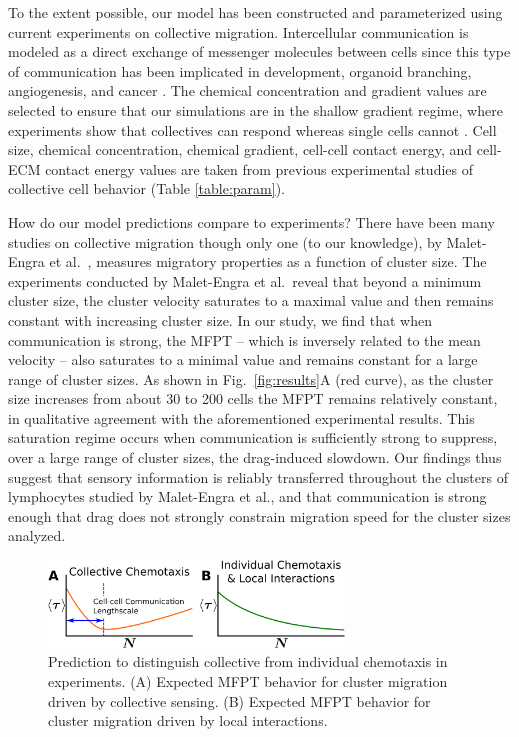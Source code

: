 To the extent possible, our model has been constructed and parameterized using current experiments on collective migration. Intercellular communication is modeled as a direct exchange of messenger molecules between cells since this type of  communication has been implicated in development, organoid branching, angiogenesis, and cancer \cite{ramel2013rab11,ellison2016cell,gerhardt2003vegf,hsu2000cadherin,friedl2009collective}. The chemical concentration and gradient values are selected to ensure that our simulations are in the shallow gradient regime, where experiments show that collectives can respond whereas single cells cannot \cite{ellison2016cell,malet2015collective,rosoff2004new}. Cell size, chemical concentration, chemical gradient, cell-cell contact energy, and cell-ECM contact energy values are taken from previous experimental studies of collective cell behavior (Table \ref{table:param}).

How do our model predictions compare to experiments? There have been many studies on collective migration \cite{cheung2013collective,puliafito2015three,defranco2008migrating,ramel2013rab11} though only one (to our knowledge), by Malet-Engra et al.\ \cite{malet2015collective}, measures migratory properties as a function of cluster size. The experiments conducted by Malet-Engra et al.\ reveal that beyond a minimum cluster size, the cluster velocity saturates to a maximal value and then remains constant with increasing cluster size. In our study, we find that when communication is strong, the MFPT -- which is inversely related to the mean velocity -- also saturates to a minimal value and remains constant for a large range of cluster sizes. As shown in Fig.\ \ref{fig:results}A (red curve), as the cluster size increases from about 30 to 200 cells the MFPT remains relatively constant, in qualitative agreement with the aforementioned experimental results. This saturation regime occurs when communication is sufficiently strong to suppress, over a large range of cluster sizes, the drag-induced slowdown. Our findings thus suggest that sensory information is reliably transferred throughout the clusters of lymphocytes studied by Malet-Engra et al., and that communication is strong enough that drag does not strongly constrain migration speed for the cluster sizes analyzed.


\begin{figure}[ht]
    \centering
        \includegraphics[width=0.7\textwidth]{../fig/ch2_fig4.png}
    \caption{Prediction to distinguish collective from individual chemotaxis in experiments. (A) Expected MFPT behavior for cluster migration driven by collective sensing. (B) Expected MFPT behavior for cluster migration driven by local interactions.} \label{fig:mfpt}
\end{figure}


